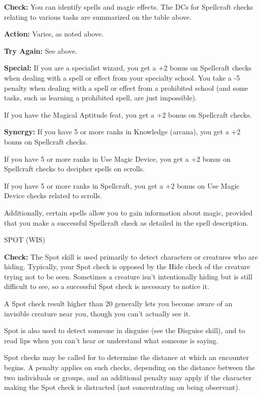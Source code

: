 \documentclass{article}
\begin{document}
\vspace{12pt}
\textbf{Check:} You can identify spells and magic effects. The DCs for Spellcraft 
checks relating to various tasks are summarized on the table above.

\textbf{Action:} Varies, as noted above.

\textbf{Try Again:} See above.

\textbf{Special:} If you are a specialist wizard, you get a +2 bonus on Spellcraft 
checks when dealing with a spell or effect from your specialty school. You take 
a -5 penalty when dealing with a spell or effect from a prohibited school (and 
some tasks, such as learning a prohibited spell, are just impossible).

If you have the Magical Aptitude feat, you get a +2 bonus on Spellcraft checks.

\textbf{Synergy:} If you have 5 or more ranks in Knowledge (arcana), you get a 
+2 bonus on Spellcraft checks.

If you have 5 or more ranks in Use Magic Device, you get a +2 bonus on Spellcraft 
checks to decipher spells on scrolls.

If you have 5 or more ranks in Spellcraft, you get a +2 bonus on Use Magic Device 
checks related to scrolls.

Additionally, certain spells allow you to gain information about magic, provided 
that you make a successful Spellcraft check as detailed in the spell description.

\vspace{12pt}
SPOT (WIS)

\textbf{Check:} The Spot skill is used primarily to detect characters or creatures 
who are hiding. Typically, your Spot check is opposed by the Hide check of the 
creature trying not to be seen. Sometimes a creature isn't intentionally hiding 
but is still difficult to see, so a successful Spot check is necessary to notice 
it.

A Spot check result higher than 20 generally lets you become aware of an invisible 
creature near you, though you can't actually see it.

Spot is also used to detect someone in disguise (see the Disguise skill), and to 
read lips when you can't hear or understand what someone is saying.

Spot checks may be called for to determine the distance at which an encounter begins. 
A penalty applies on such checks, depending on the distance between the two individuals 
or groups, and an additional penalty may apply if the character making the Spot 
check is distracted (not concentrating on being observant).
\end{document}

